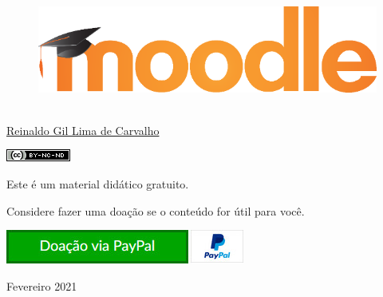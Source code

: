 \thispagestyle{empty}

\begin{center}
  \begin{figure}[H]
    \begin{center}
      \hspace{-1cm}
      \includegraphics[width=0.55\columnwidth]{titlepage}
  ~\cite{FrontPageIMG}
    \end{center}      
  \end{figure}

  \vskip 2cm

  \hspace{-1cm}
  \begin{minipage}[c]{17cm}
    \begin{center}

{\huge {}\vskip 0.15cm %

{\large \href{http://reinaldoc.wordpress.com}{Reinaldo Gil Lima de Carvalho}} %

{\includegraphics[width=0.1\columnwidth]{imgs/license-CC-BY-NC-ND_header.png}}

\vskip 7cm

{\large {Este é um material didático gratuito.}}

\vskip 0.15cm

{\large {Considere fazer uma doação se o conteúdo for útil para você.}}

\vskip 1cm

\href{https://www.paypal.com/cgi-bin/webscr?cmd=_s-xclick&hosted_button_id=9S2QRNKE3WKM6}{
    {\includegraphics[width=0.4\columnwidth]{imgs/donate.jpg}}
  }
}
    \end{center}
  \end{minipage}

  \vskip 3cm

  {\huge Fevereiro 2021} %
\end{center}
